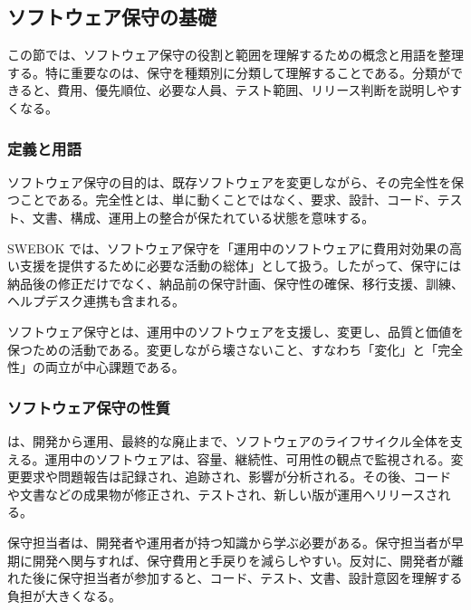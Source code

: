 \subsection{ソフトウェア保守の基礎}
この節では、ソフトウェア保守の役割と範囲を理解するための概念と用語を整理する。特に重要なのは、保守を種類別に分類して理解することである。分類ができると、費用、優先順位、必要な人員、テスト範囲、リリース判断を説明しやすくなる。\par
\subsubsection{定義と用語}
ソフトウェア保守の目的は、既存ソフトウェアを変更しながら、その完全性を保つことである。完全性とは、単に動くことではなく、要求、設計、コード、テスト、文書、構成、運用上の整合が保たれている状態を意味する。\par
SWEBOK では、ソフトウェア保守を「運用中のソフトウェアに費用対効果の高い支援を提供するために必要な活動の総体」として扱う。したがって、保守には納品後の修正だけでなく、納品前の保守計画、保守性の確保、移行支援、訓練、ヘルプデスク連携も含まれる。\par
\begin{definitionbox}ソフトウェア保守とは、運用中のソフトウェアを支援し、変更し、品質と価値を保つための活動である。変更しながら壊さないこと、すなわち「変化」と「完全性」の両立が中心課題である。\end{definitionbox}
\subsubsection{ソフトウェア保守の性質}
は、開発から運用、最終的な廃止まで、ソフトウェアのライフサイクル全体を支える。運用中のソフトウェアは、容量、継続性、可用性の観点で監視される。変更要求や問題報告は記録され、追跡され、影響が分析される。その後、コードや文書などの成果物が修正され、テストされ、新しい版が運用へリリースされる。\par
保守担当者は、開発者や運用者が持つ知識から学ぶ必要がある。保守担当者が早期に開発へ関与すれば、保守費用と手戻りを減らしやすい。反対に、開発者が離れた後に保守担当者が参加すると、コード、テスト、文書、設計意図を理解する負担が大きくなる。\par
